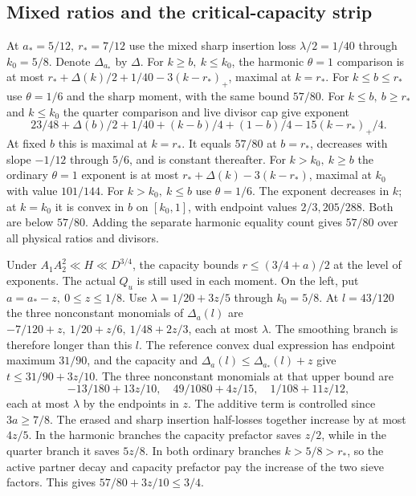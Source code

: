 \subsection{Mixed ratios and the critical-capacity strip}
\label{pca:detail-mixed}

At \(a_*=5/12,\ r_*=7/12\) use the mixed sharp insertion loss
\(\lambda/2=1/40\) through \(k_0=5/8\). Denote
\(\Delta_{a_*}\) by \(\Delta\).
For \(k\ge b,\ k\le k_0\), the harmonic \(\theta=1\)
comparison is at most
\(r_*+\Delta(k)/2+1/40-3(k-r_*)_+\), maximal at \(k=r_*\).
For \(k\le b\le r_*\) use \(\theta=1/6\) and the sharp
moment, with the same bound \(57/80\). For \(k\le b,\ b\ge r_*\)
and \(k\le k_0\) the quarter comparison and live divisor cap
give exponent
\[
 23/48+\Delta(b)/2+1/40+(k-b)/4+(1-b)/4
                                      -15(k-r_*)_+/4 .
\]
At fixed \(b\) this is maximal at \(k=r_*\). It equals \(57/80\)
at \(b=r_*\), decreases with slope \(-1/12\) through \(5/6\),
and is constant thereafter. For \(k>k_0,\ k\ge b\) the ordinary
\(\theta=1\) exponent is at most \(r_*+\Delta(k)-3(k-r_*)\),
maximal at \(k_0\) with value \(101/144\). For \(k>k_0,\ k\le b\)
use \(\theta=1/6\). The exponent decreases in \(k\); at \(k=k_0\)
it is convex in \(b\) on \([k_0,1]\), with endpoint values
\(2/3,205/288\). Both are below \(57/80\).
Adding the separate harmonic equality count gives \(57/80\)
over all physical ratios and divisors.

Under \(A_1A_2^2\ll H\ll D^{3/4}\), the capacity bounds
\(r\le(3/4+a)/2\) at the level of exponents. The actual
\(Q_u\) is still used in each moment.
On the left, put \(a=a_*-z,\ 0\le z\le1/8\).
Use \(\lambda=1/20+3z/5\) through \(k_0=5/8\).
At \(l=43/120\) the three nonconstant monomials of
\(\Delta_a(l)\) are
\(-7/120+z,\ 1/20+z/6,\ 1/48+2z/3\), each at most \(\lambda\).
The smoothing branch is therefore longer than this \(l\).
The reference convex dual expression has endpoint maximum
\(31/90\), and the capacity and
\(\Delta_a(l)\le\Delta_{a_*}(l)+z\) give
\(t\le31/90+3z/10\). The three nonconstant monomials
at that upper bound are
\[
 -13/180+13z/10,\quad 49/1080+4z/15,\quad 1/108+11z/12 ,
\]
each at most \(\lambda\) by the endpoints in \(z\).
The additive term is controlled since \(3a\ge7/8\).
The erased and sharp insertion half-losses together increase
by at most \(4z/5\). In the harmonic branches the capacity
prefactor saves \(z/2\), while in the quarter branch it saves
\(5z/8\). In both ordinary branches \(k>5/8>r_*\), so the
active partner decay and capacity prefactor pay the increase
of the two sieve factors. This gives \(57/80+3z/10\le3/4\).

